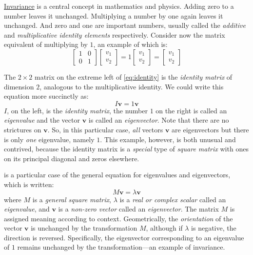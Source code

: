 \documentclass[
  11pt,
  a4paper,
]{article}
\begin{document}
\href{http://mathworld.wolfram.com/Invariant.html}{Invariance} is a
central concept in mathematics and physics. Adding zero to a number
leaves it unchanged. Multiplying a number by one again leaves it
unchanged. And zero and one are important numbers, usually called the
\emph{additive} and \emph{multiplicative identity elements}
respectively. Consider now the matrix equivalent of multiplying by
\(1\), an example of which is: \begin{equation}
\begin{bmatrix}1 & 0\\0 & 1\end{bmatrix}\begin{bmatrix}v_{1}\\v_{2}\end{bmatrix}
= 1\begin{bmatrix}v_{1}\\v_{2}\end{bmatrix} = \begin{bmatrix}v_{1}\\v_{2}\end{bmatrix}
\label{eq:identity}\end{equation}

The \(2 \times 2\) matrix on the extreme left of \cref{eq:identity} is
the \emph{identity matrix} of dimension \(2\), analogous to the
multiplicative identity. We could write this equation more succinctly
as: \begin{equation}
I\symbf{v} = 1\symbf{v}
\label{eq:succinct}\end{equation} \(I\), on the left, is the
\emph{identity matrix}, the number \(1\) on the right is called an
\emph{eigenvalue} and the vector \(\symbf{v}\) is called an
\emph{eigenvector}. Note that there are no strictures on \(\symbf{v}\).
So, in this particular case, \emph{all} vectors \(\symbf{v}\) are
eigenvectors but there is only \emph{one} eigenvalue, namely \(1\). This
example, however, is both unusual and contrived, because the identity
matrix is a \emph{special} type of \emph{square matrix} with ones on its
principal diagonal and zeros elsewhere.

 is a particular case of the general equation for
eigenvalues and eigenvectors, which is written: \begin{equation}
M\symbf{v} = \lambda \symbf{v}
\label{eq:eigen}\end{equation} where \(M\) is a \emph{general square
matrix}, \({\lambda}\) is a \emph{real or complex scalar} called an
\emph{eigenvalue}, and \(\symbf{v}\) is a \emph{non-zero vector} called
an \emph{eigenvector}. The matrix \(M\) is assigned meaning according to
context. Geometrically, the \emph{orientation} of the vector
\(\symbf{v}\) is unchanged by the transformation \(M\), although if
\(\lambda\) is negative, the direction is reversed. Specifically, the
eigenvector corresponding to an eigenvalue of \(1\) remains unchanged by
the transformation---an example of invariance.
\end{document}
